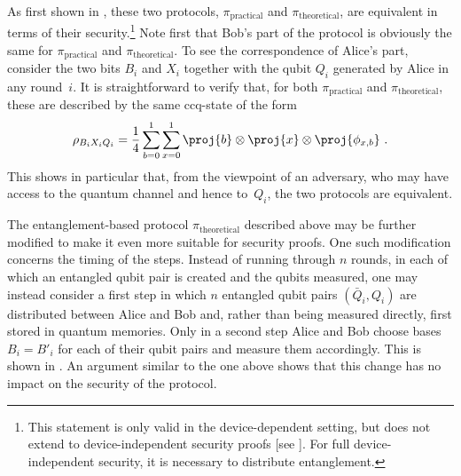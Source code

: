 As first shown in \textcite{BBM92}, these two protocols, $\pi_{\mathrm{practical}}$ and $\pi_{\mathrm{theoretical}}$, are equivalent in terms of their security.\footnote{This statement is only valid in the device-dependent setting, but does not extend to device-independent security proofs [see \textcite{ER14}]. For full device-independent security, it is necessary to distribute entanglement.} Note first that Bob's part of the protocol is obviously the same for $\pi_{\mathrm{practical}}$ and $\pi_{\mathrm{theoretical}}$. To see the correspondence of Alice's part, consider the two bits $B_i$ and $X_i$ together with the qubit $Q_i$ generated by Alice in any round~$i$. It is straightforward to verify that, for both $\pi_{\mathrm{practical}}$ and $\pi_{\mathrm{theoretical}}$, these are described by the same ccq-state of the form
\begin{align}
  \rho_{B_i X_i Q_i}
  = \frac{1}{4} \sum_{b=0}^1 \sum_{x=0}^1 \proj{b} \otimes \proj{x} \otimes \proj{\phi_{x,b}} \ .
\end{align}
This shows in particular that, from the viewpoint of an adversary, who may have access to the quantum channel and hence to~$Q_i$, the two protocols are equivalent. 

The entanglement-based protocol $\pi_{\mathrm{theoretical}}$ described above may be further modified to make it even more suitable for security proofs. One such modification concerns the timing of the steps. Instead of running through $n$ rounds,  in each of which an entangled qubit pair is created and the qubits measured, one may instead consider a first step in which $n$ entangled qubit pairs $(\bar{Q}_i, Q_i)$ are distributed between Alice and Bob and, rather than being measured directly, first stored in quantum memories. Only in a second step Alice and Bob choose bases $B_i = B'_i$ for each of their qubit pairs and measure them accordingly. This is shown in . An argument similar to the one above shows that this change has no impact on the security of the protocol. 

